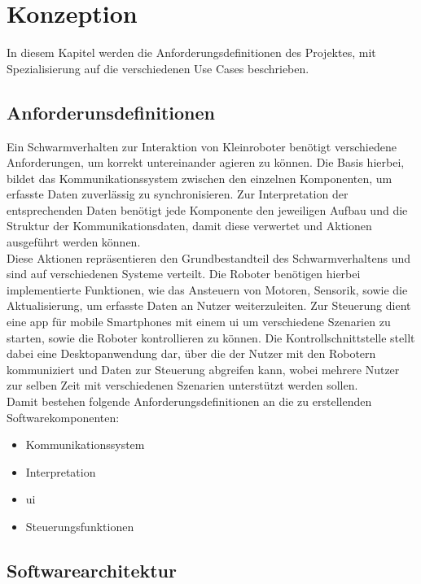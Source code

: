 \color{finishing}

\section{Konzeption}

In diesem Kapitel werden die Anforderungsdefinitionen des Projektes, mit Spezialisierung auf die verschiedenen Use Cases beschrieben.

\subsection{Anforderunsdefinitionen}

Ein Schwarmverhalten zur Interaktion von Kleinroboter benötigt verschiedene Anforderungen, um korrekt untereinander agieren zu können. Die Basis hierbei, bildet das Kommunikationssystem zwischen den einzelnen Komponenten, um erfasste Daten zuverlässig zu synchronisieren. Zur Interpretation der entsprechenden Daten benötigt jede Komponente den jeweiligen Aufbau und die Struktur der Kommunikationsdaten, damit diese verwertet und Aktionen ausgeführt werden können.\\
Diese Aktionen repräsentieren den Grundbestandteil des Schwarmverhaltens und sind auf verschiedenen Systeme verteilt. Die Roboter benötigen hierbei implementierte Funktionen, wie das Ansteuern von Motoren, Sensorik, sowie die Aktualisierung, um erfasste Daten an Nutzer weiterzuleiten. Zur Steuerung dient eine \gls{app} für mobile Smartphones mit einem \gls{ui} um verschiedene Szenarien zu starten, sowie die Roboter kontrollieren zu können. Die Kontrollschnittstelle stellt dabei eine Desktopanwendung dar, über die der Nutzer mit den Robotern kommuniziert und Daten zur Steuerung abgreifen kann, wobei mehrere Nutzer zur selben Zeit mit verschiedenen Szenarien unterstützt werden sollen.\\

\noindent
Damit bestehen folgende Anforderungsdefinitionen an die zu erstellenden Softwarekomponenten:
\begin{itemize}
	\item Kommunikationssystem
	\item Interpretation
	\item \gls{ui}
	\item Steuerungsfunktionen
\end{itemize}

\newpage
\subsection{Softwarearchitektur}

